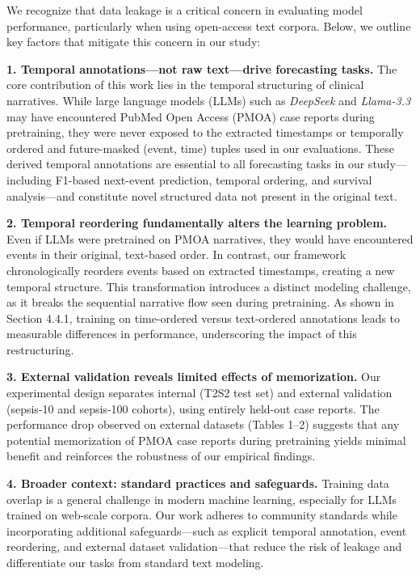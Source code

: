 We recognize that data leakage is a critical concern in evaluating model performance, particularly when using open-access text corpora. Below, we outline key factors that mitigate this concern in our study:

\textbf{1. Temporal annotations—not raw text—drive forecasting tasks.}
The core contribution of this work lies in the temporal structuring of clinical narratives. While large language models (LLMs) such as \textit{DeepSeek} and \textit{Llama-3.3} may have encountered PubMed Open Access (PMOA) case reports during pretraining, they were never exposed to the extracted timestamps or temporally ordered and future-masked (event, time) tuples used in our evaluations. These derived temporal annotations are essential to all forecasting tasks in our study—including F1-based next-event prediction, temporal ordering, and survival analysis—and constitute novel structured data not present in the original text.

\textbf{2. Temporal reordering fundamentally alters the learning problem.}
Even if LLMs were pretrained on PMOA narratives, they would have encountered events in their original, text-based order. In contrast, our framework chronologically reorders events based on extracted timestamps, creating a new temporal structure. This transformation introduces a distinct modeling challenge, as it breaks the sequential narrative flow seen during pretraining. As shown in Section 4.4.1, training on time-ordered versus text-ordered annotations leads to measurable differences in performance, underscoring the impact of this restructuring.

\textbf{3. External validation reveals limited effects of memorization.}
Our experimental design separates internal (T2S2 test set) and external validation (sepsis-10 and sepsis-100 cohorts), using entirely held-out case reports. The performance drop observed on external datasets (Tables 1–2) suggests that any potential memorization of PMOA case reports during pretraining yields minimal benefit and reinforces the robustness of our empirical findings.

\textbf{4. Broader context: standard practices and safeguards.}
Training data overlap is a general challenge in modern machine learning, especially for LLMs trained on web-scale corpora. Our work adheres to community standards while incorporating additional safeguards—such as explicit temporal annotation, event reordering, and external dataset validation—that reduce the risk of leakage and differentiate our tasks from standard text modeling.

